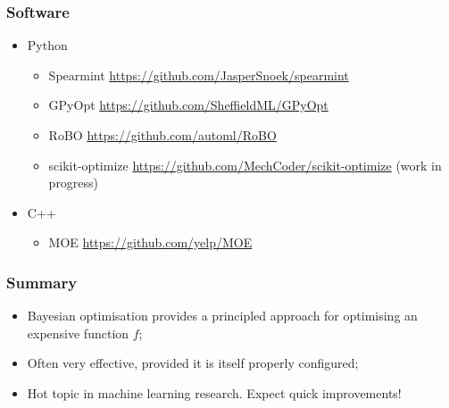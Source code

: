 \documentclass{beamer}
\begin{document}
\begin{frame}
    \frametitle{Software}

    \begin{itemize}
        \item Python
        \begin{itemize}\scriptsize
            \item Spearmint \url{https://github.com/JasperSnoek/spearmint}
            \item GPyOpt \url{https://github.com/SheffieldML/GPyOpt}
            \item RoBO \url{https://github.com/automl/RoBO}
            \item scikit-optimize \url{https://github.com/MechCoder/scikit-optimize} (work in progress)
        \end{itemize}

        \item C++
        \begin{itemize}\scriptsize
            \item MOE \url{https://github.com/yelp/MOE}
        \end{itemize}
    \end{itemize}

\end{frame}

\begin{frame}
    \frametitle{Summary}

    \begin{itemize}
        \item Bayesian optimisation provides a principled approach for optimising an expensive function $f$;

        \vspace{1em}

        \item Often very effective, provided it is itself properly configured;

        \vspace{1em}

        \item Hot topic in machine learning research. Expect quick improvements!
    \end{itemize}

\end{frame}
\end{document}
